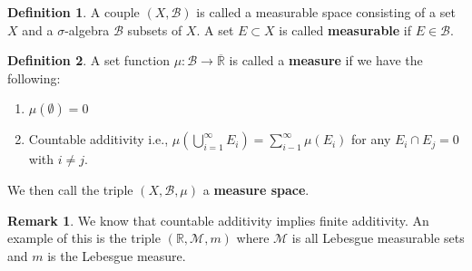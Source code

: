 \documentclass[12pt]{article}
\newcommand{\R}{\mathbb{R}}
\newcommand{\B}{\mathcal{B}}
\theoremstyle{definition}
\newtheorem*{definition}{Definition}
\newtheorem*{remark}{Remark}
\begin{document}
\begin{definition}
    A couple \( (X, \B) \) is called a measurable space consisting of a set \(X\) and a \(\sigma\)-algebra \( \B \) subsets of \( X \). A set \( E \subset X \) is called \textbf{measurable} if \( E \in \B \).
\end{definition}

\begin{definition}
    A set function \( \mu: \B \to \overline{\R} \) is called a \textbf{measure} if we have the following:
        \begin{enumerate}
            \item \( \mu(\emptyset) = 0 \) 
            \item Countable additivity i.e., \( \displaystyle \mu \left( \bigcup_{i=1}^{\infty} E_i \right) = \sum_{i-1}^{\infty} \mu \left( E_i \right)\) 
            for any \( E_i \cap E_j = 0 \) with \( i \neq j \).
        \end{enumerate}
    We then call the triple \( (X, \B, \mu) \) a  \textbf{measure space}.
\end{definition}

\begin{remark}
    We know that countable additivity implies finite additivity. An example of this is the triple \( (\R, \mathcal{M}, m) \) where \(\mathcal{M} \) is all Lebesgue measurable sets and \( m \) is the Lebesgue measure. 
\end{remark}
\end{document}
